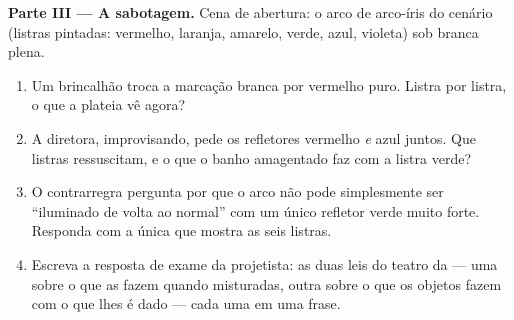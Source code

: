 \begin{problem}
\medskip\noindent\textbf{Parte III --- A sabotagem.}
Cena de abertura: o arco de arco-íris do cenário (listras pintadas:
vermelho, laranja, amarelo, verde, azul, violeta) sob  branca
plena.
\begin{enumerate}[resume]
  \item Um brincalhão troca a marcação branca por vermelho puro.
        Listra por listra, o que a plateia vê agora?
  \item A diretora, improvisando, pede os refletores vermelho
        \emph{e} azul juntos. Que listras ressuscitam, e o que o
        banho amagentado faz com a listra verde?
  \item O contrarregra pergunta por que o arco não pode simplesmente
        ser ``iluminado de volta ao normal'' com um único refletor
        verde muito forte. Responda com a única  que mostra as
        seis listras.
  \item Escreva a resposta de exame da projetista: as duas leis do
        teatro da  --- uma sobre o que as  fazem quando
        misturadas, outra sobre o que os objetos fazem com o que lhes
        é dado --- cada uma em uma frase.
\end{enumerate}
\end{problem}
